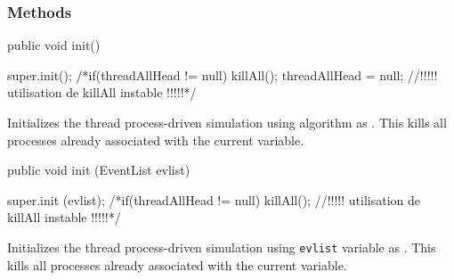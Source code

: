 \subsubsection* {Methods}
\begin{code}
   public void init() \begin{hide} {
      super.init();
      /*if(threadAllHead != null)
         killAll();
      threadAllHead = null;                    //!!!!! utilisation de killAll instable !!!!!*/
   } \end{hide}
\end{code}
\begin{tabb}   Initializes the thread process-driven simulation  using
  algorithm
 as .
   This kills all processes already associated with the current variable.
\end{tabb}
\begin{code}

   public void init (EventList evlist) \begin{hide} {
      super.init (evlist);
      /*if(threadAllHead != null)
         killAll();                            //!!!!! utilisation de killAll instable !!!!!*/
   } \end{hide}
\end{code}
\begin{tabb}   Initializes the thread process-driven simulation
   using \texttt{evlist} variable as .
   This kills all processes already associated with the current variable.
\end{tabb}
\begin{htmlonly}
\end{htmlonly}
